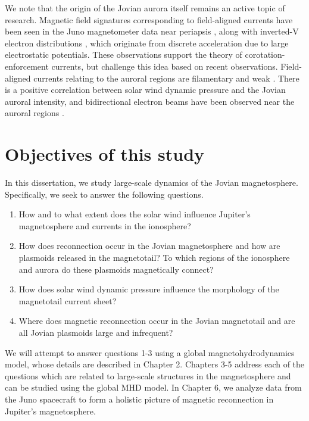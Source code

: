 We note that the origin of the Jovian aurora itself remains an active topic of research. Magnetic field signatures corresponding to field-aligned currents have been seen in the Juno magnetometer data near periapsis \cite{Kotsiaros2019BirkelandSpacecraft}, along with inverted-V electron distributions \cite{Mauk2017TheMission}, which originate from discrete acceleration due to large electrostatic potentials. These observations support the theory of corotation-enforcement currents, but  challenge this idea based on recent observations. Field-aligned currents relating to the auroral regions are filamentary and weak \cite{Kotsiaros2019BirkelandSpacecraft}. There is a positive correlation between solar wind dynamic pressure and the Jovian auroral intensity, and bidirectional electron beams have been observed near the auroral regions \cite{Mauk2018DiverseAurora}. 

\section{Objectives of this study}
In this dissertation, we study large-scale dynamics of the Jovian magnetosphere. Specifically, we seek to answer the following questions. 
\begin{enumerate}
    \item How and to what extent does the solar wind influence Jupiter's magnetosphere and currents in the ionosphere?
    \item How does reconnection occur in the Jovian magnetosphere and how are plasmoids released in the magnetotail? To which regions of the ionosphere and aurora do these plasmoids magnetically connect?
    \item How does solar wind dynamic pressure influence the morphology of the magnetotail current sheet?
    \item Where does magnetic reconnection occur in the Jovian magnetotail and are all Jovian plasmoids large and infrequent?
\end{enumerate}

We will attempt to answer questions 1-3 using a global magnetohydrodynamics model, whose details are described in Chapter 2. Chapters 3-5 address each of the questions which are related to large-scale structures in the magnetosphere and can be studied using the global MHD model. In Chapter 6, we analyze data from the Juno spacecraft to form a holistic picture of magnetic reconnection in Jupiter's magnetosphere. 


